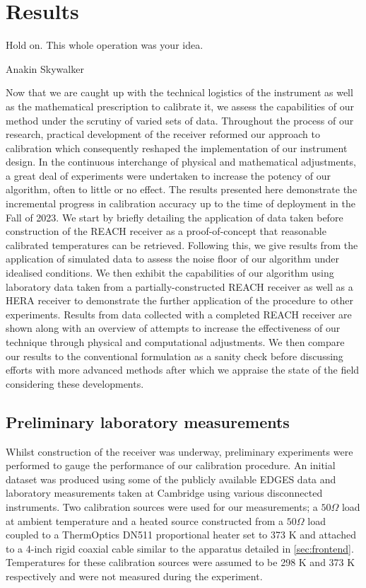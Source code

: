 \chapter{Results}\label{chap:results}

\ifpdf
    \graphicspath{{results/figs/Raster/}{results/figs/PDF/}{results/figs/}}
\else
    \graphicspath{{results/figs/Vector/}{results/figs/}}
\fi

\epigraph{Hold on. This whole operation was your idea.}{Anakin Skywalker}

Now that we are caught up with the technical logistics of the instrument as well as the mathematical prescription to calibrate it, we assess the capabilities of our method under the scrutiny of varied sets of data. Throughout the process of our research, practical development of the receiver reformed our approach to calibration which consequently reshaped the implementation of our instrument design. In the continuous interchange of physical and mathematical adjustments, a great deal of experiments were undertaken to increase the potency of our algorithm, often to little or no effect. The results presented here demonstrate the incremental progress in calibration accuracy up to the time of deployment in the Fall of 2023. We start by briefly detailing the application of data taken before construction of the REACH receiver as a proof-of-concept that reasonable calibrated temperatures can be retrieved. Following this, we give results from the application of simulated data to assess the noise floor of our algorithm under idealised conditions. We then exhibit the capabilities of our algorithm using laboratory data taken from a partially-constructed REACH receiver as well as a HERA receiver to demonstrate the further application of the procedure to other experiments. Results from data collected with a completed REACH receiver are shown along with an overview of attempts to increase the effectiveness of our technique through physical and computational adjustments. We then compare our results to the conventional formulation as a sanity check before discussing efforts with more advanced methods after which we appraise the state of the field considering these developments.


\section{Preliminary laboratory measurements}\label{sec:mphil_results}
Whilst construction of the receiver was underway, preliminary experiments were performed to gauge the performance of our calibration procedure. An initial dataset was produced using some of the publicly available EDGES data and laboratory measurements taken at Cambridge using various disconnected instruments. Two calibration sources were used for our measurements; a $50 \Omega$ load at ambient temperature and a heated source constructed from a $50 \Omega$ load coupled to a ThermOptics DN511 proportional heater set to 373 K and attached to a 4-inch rigid coaxial cable similar to the apparatus detailed in \cref{sec:frontend}. Temperatures for these calibration sources were assumed to be 298 K and 373 K respectively and were not measured during the experiment.

